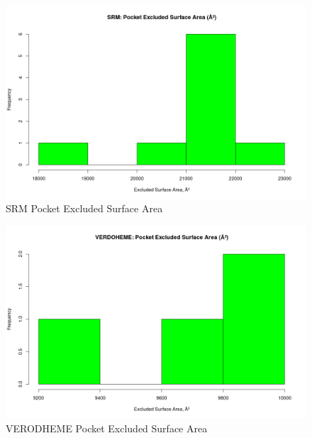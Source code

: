 	\begin{figure}
		\caption{SRM Pocket Excluded Surface Area}
		\label{figs:SRM_pocketExcSA}
		\includegraphics[width=\linewidth]{7A/SRM_pocketExcSA}
	\end{figure}
	
	\begin{figure}
		\caption{VERODHEME Pocket Excluded Surface Area}
		\label{figs:VERDOHEME_pocketExcSA}
		\includegraphics[width=\linewidth]{7A/VERDOHEME_pocketExcSA}
	\end{figure}
	
